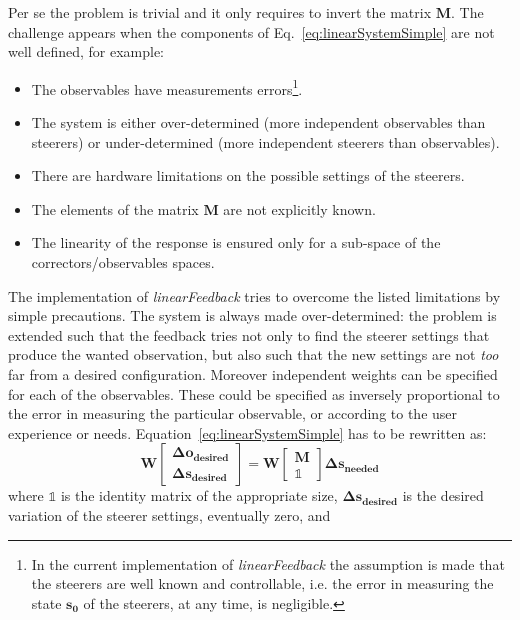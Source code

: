 Per se the problem is trivial and it only requires to invert the matrix $\bm{M}$. 
The challenge appears when the components of Eq.~\ref{eq:linearSystemSimple} are not well defined, for
example:
%
\begin{itemize}
\item The observables have measurements errors\footnote{In the current implementation of
\emph{linearFeedback} the assumption is made that the steerers are well known and controllable, i.e.
the error in measuring the state $\bm{s_0}$ of the steerers, at any time, is negligible.}.
\item The system is either over-determined (more independent observables than steerers) or
under-determined (more independent steerers than observables).
\item There are hardware limitations on the possible settings of the steerers.
\item %
The elements of the matrix $ \bm{M}$ are not explicitly known.
\item The linearity of the response is ensured only for a sub-space of the correctors/observables spaces.
\end{itemize}
%
The implementation of \emph{linearFeedback} tries to overcome the listed limitations by simple precautions.
The system is always made over-determined: the problem is extended such that the feedback tries not
only to find the steerer settings that produce the wanted observation, 
but also such that the new settings are not \emph{too} far from a desired configuration.
Moreover independent weights can be specified for each of the observables.
These could be specified as inversely proportional to the error in measuring the particular
observable, or according to the user experience or needs.
Equation~\ref{eq:linearSystemSimple} has to be rewritten as:
%
\begin{equation}
\bm{W}
\begin{bmatrix}
\bm{\Delta o_{\text{desired}}}\\
\bm{\Delta s_{\text{desired}}}
\end{bmatrix}
=
\bm{W}
\begin{bmatrix}
\bm{M} \\
\mathds{1}
\end{bmatrix}
\bm{\Delta s_{\text{needed}}}
\label{eq:linearSystemWithDump}
\end{equation}
%
where $\mathds{1}$ is the identity matrix of the appropriate size, $\bm{\Delta
s_{\text{desired}}}$ is the desired variation of the steerer settings, eventually zero, and

